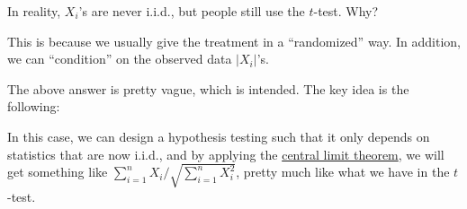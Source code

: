 \begin{problem*}
	In reality, \(X_i\)'s are never i.i.d., but people still use the \(t\)-test. Why?
\end{problem*}
\begin{answer}
	This is because we usually give the treatment in a ``randomized'' way. In addition, we can ``condition'' on the observed data \(\vert X_i \vert \)'s.
\end{answer}

The above answer is pretty vague, which is intended. The key idea is the following:

\begin{intuition}
	In this case, we can design a hypothesis testing such that it only depends on statistics that are now i.i.d., and by applying the \hyperref[thm:CLT]{central limit theorem}, we will get something like \(\sum_{i=1}^{n} X_i / \sqrt{\sum_{i=1}^{n} X_i^2} \), pretty much like what we have in the \(t\)-test.
\end{intuition}